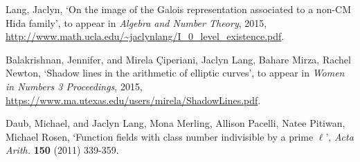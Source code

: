 \documentclass[12pt]{article}
\begin{document}
\begin{thebibliography}{3}
\bibitem{} Lang, Jaclyn, `On the image of the Galois representation associated to a non-CM Hida family', to appear in \textit{Algebra and Number Theory}, 2015, \url{http://www.math.ucla.edu/~jaclynlang/I_0_level_existence.pdf}.

\bibitem{} Balakrishnan, Jennifer, and Mirela \c{Ciperiani}, Jaclyn Lang, Bahare Mirza, Rachel Newton, `Shadow lines in the arithmetic of elliptic curves', to appear in \textit{Women in Numbers 3 Proceedings}, 2015, \url{https://www.ma.utexas.edu/users/mirela/ShadowLines.pdf}.

\bibitem{} Daub, Michael, and Jaclyn Lang, Mona Merling, Allison Pacelli, Natee Pitiwan, Michael Rosen, `Function fields with class number indivisible by a prime $\ell$', \textit{Acta Arith.} \textbf{150} (2011) 339-359. 

\end{thebibliography}
\end{document}

